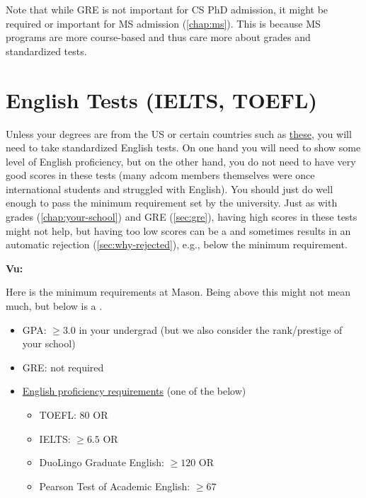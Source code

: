 \documentclass[oneside,11pt,dvipsnames]{book}
\newenvironment{commentbox}[1][]{
  \small
  \begin{mybox}
    {\small \textbf{#1}}
  }{
  \end{mybox}
}
\newcommand{\red}[1]{{\color{red}{#1}}}
\begin{document}
Note that while GRE is not important for CS PhD admission, it might be required or important for MS admission (\autoref{chap:ms}). This is because MS programs are more course-based and thus care more about grades and standardized tests.

\section{English Tests (IELTS, TOEFL)}\label{sec:english-tests} 

Unless your degrees are from the US or certain countries such as \href{https://www.gmu.edu/international/english-language-requirements}{these}, you will need to take standardized English tests. On one hand you will need to show some level of English proficiency, but on the other hand, you do not need to have very good scores in these tests (many adcom members themselves were once international students and struggled with English).
You should just do well enough to pass the minimum requirement set by the university. %
Just as with grades (\autoref{chap:your-school}) and GRE (\autoref{sec:gre}), having high scores in these tests might not help, but having too low scores can be a \red{red flag} and sometimes results in an automatic rejection (\autoref{sec:why-rejected}), e.g., below the minimum requirement.


\begin{commentbox}[Vu:]
  Here is the minimum requirements at Mason. 
  Being above this might not mean much, but below is a \red{red flag}.
  \begin{itemize}
    \item GPA: $\ge 3.0$ in your undergrad (but we also consider the rank/prestige of your school)
    \item GRE: not required 
    \item \href{https://www.gmu.edu/international/english-language-requirements}{English proficiency requirements} (one of the below)
          \begin{itemize}
            \item TOEFL: 80 OR
            \item IELTS: $\ge 6.5$ OR
            \item DuoLingo Graduate English: $\ge 120$ OR
            \item Pearson Test of Academic English: $\ge 67$
          \end{itemize}
  \end{itemize}
\end{commentbox}
\end{document}
